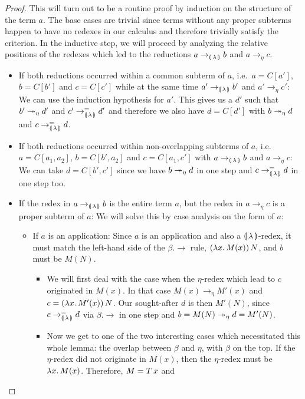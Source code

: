 \begin{proof}
  This will turn out to be a routine proof by induction on the structure of
  the term $a$. The base cases are trivial since terms without any proper
  subterms happen to have no redexes in our calculus and therefore
  trivially satisfy the criterion. In the inductive step, we will proceed
  by analyzing the relative positions of the redexes which led to the
  reductions $a \to_{\llparenthesis \, \lambda \, \rrparenthesis} b$ and $a \to_\eta c$.
  \begin{itemize}
  \item If both reductions occurred within a common subterm of $a$, i.e.\
    $a = C[a']$, $b = C[b']$ and $c = C[c']$ while at the same time
    $a' \to_{\llparenthesis \, \lambda \, \rrparenthesis} b'$ and $a' \to_\eta c'$: We can use the induction
    hypothesis for $a'$. This gives us a $d'$ such that $b' \twoheadrightarrow_\eta d'$
    and $c' \to_{\llparenthesis \, \lambda \, \rrparenthesis}^= d'$ and therefore we also have $d = C[d']$ with
    $b \twoheadrightarrow_\eta d$ and $c \to_{\llparenthesis \, \lambda \, \rrparenthesis}^= d$.
  \item If both reductions occurred within non-overlapping subterms of $a$,
    i.e.\ $a = C[a_1, a_2]$, $b = C[b', a_2]$ and $c = C[a_1, c']$ with
    $a \to_{\llparenthesis \, \lambda \, \rrparenthesis} b$ and $a \to_\eta c$: We can take $d = C[b', c']$ since
    we have $b \twoheadrightarrow_\eta d$ in one step and $c \to_{\llparenthesis \, \lambda \, \rrparenthesis}^= d$ in one step
    too.
  \item If the redex in $a \to_{\llparenthesis \, \lambda \, \rrparenthesis} b$ is the entire term $a$, but the
    redex in $a \to_\eta c$ is a proper subterm of $a$: We will solve this
    by case analysis on the form of $a$:
    \begin{itemize}
    \item If $a$ is an application: Since $a$ is an application and also a
      $\llparenthesis \, \lambda \, \rrparenthesis$-redex, it must match the left-hand side of the
      $\beta.\to$ rule, $(\lambda x.\, M(x))\,N$, and $b$ must be $M(N)$.
      \begin{itemize}
      \item We will first deal with the case when the $\eta$-redex which
        lead to $c$ originated in $M(x)$. In that case
        $M(x) \to_\eta M'(x)$ and $c = (\lambda x.\, M'(x))\,N$. Our
        sought-after $d$ is then $M'(N)$, since $c \to_{\llparenthesis \, \lambda \, \rrparenthesis}^= d$ via
        $\beta.\to$ in one step and $b = M(N) \twoheadrightarrow_\eta d = M'(N)$.
      \item Now we get to one of the two interesting cases which
        necessitated this whole lemma: the overlap between $\beta$ and
        $\eta$, with $\beta$ on the top. If the $\eta$-redex did not
        originate in $M(x)$, then the $\eta$-redex must be
        $\lambda x.\, M(x)$. Therefore, $M = T\,x$ and

\end{itemize}
\end{itemize}
\end{itemize}
\end{proof}

